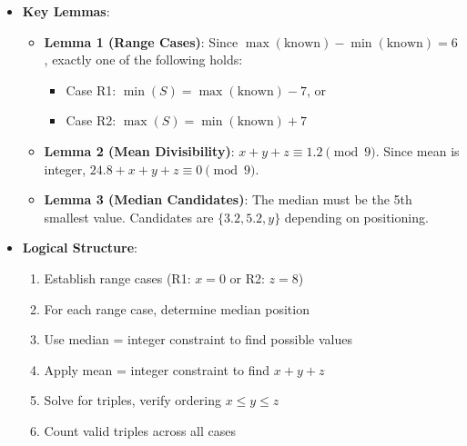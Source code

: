 \documentclass[11pt]{article}
\begin{document}
\begin{strategicbox}
\begin{itemize}[leftmargin=*]
    \item \textbf{Key Lemmas}: 
    \begin{itemize}
        \item \textbf{Lemma 1 (Range Cases)}: Since $\max(\text{known}) - \min(\text{known}) = 6$, exactly one of the following holds:
        \begin{itemize}
            \item Case R1: $\min(S) = \max(\text{known}) - 7$, or
            \item Case R2: $\max(S) = \min(\text{known}) + 7$
        \end{itemize}
        \item \textbf{Lemma 2 (Mean Divisibility)}: $x + y + z \equiv 1.2 \pmod{9}$. Since mean is integer, $24.8 + x + y + z \equiv 0 \pmod{9}$.
        \item \textbf{Lemma 3 (Median Candidates)}: The median must be the 5th smallest value. Candidates are $\{3.2, 5.2, y\}$ depending on positioning.
    \end{itemize}
    
    \item \textbf{Logical Structure}: 
    \begin{enumerate}
        \item Establish range cases (R1: $x = 0$ or R2: $z = 8$)
        \item For each range case, determine median position
        \item Use median = integer constraint to find possible values
        \item Apply mean = integer constraint to find $x + y + z$
        \item Solve for triples, verify ordering $x \leq y \leq z$
        \item Count valid triples across all cases
    \end{enumerate}
\end{itemize}
\end{strategicbox}
\end{document}
